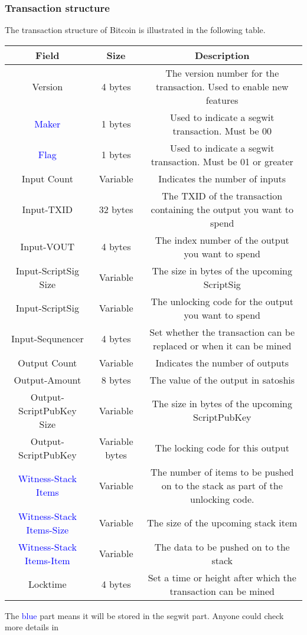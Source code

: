 \subsubsection{Transaction structure}

The transaction structure of Bitcoin is illustrated in the following table. \newline

\begin{tabular}{|c|c|c|} \hline
    Field & Size & Description \\ \hline
    Version & 4 bytes & The version number for the transaction. Used to enable new features  \\ \hline
    \textcolor{blue}{Maker} & 1 bytes & Used to indicate a segwit transaction. Must be 00 \\ \hline
    \textcolor{blue}{Flag} & 1 bytes & Used to indicate a segwit transaction. Must be 01 or greater  \\ \hline
    Input Count & Variable & Indicates the number of inputs  \\ \hline
    Input-TXID & 32 bytes & The TXID of the transaction containing the output you want to spend  \\ \hline
    Input-VOUT & 4 bytes & The index number of the output you want to spend  \\ \hline
    Input-ScriptSig Size & Variable & The size in bytes of the upcoming ScriptSig  \\ \hline
    Input-ScriptSig & Variable & The unlocking code for the output you want to spend  \\ \hline
    Input-Sequnencer & 4 bytes & Set whether the transaction can be replaced or when it can be mined  \\ \hline
    Output Count & Variable & Indicates the number of outputs  \\ \hline
    Output-Amount & 8 bytes & The value of the output in satoshis  \\ \hline
    Output-ScriptPubKey Size & Variable & The size in bytes of the upcoming ScriptPubKey  \\ \hline
    Output-ScriptPubKey & Variable bytes & The locking code for this output  \\ \hline
    \textcolor{blue}{Witness-Stack Items} & Variable & The number of items to be pushed on to the stack as part of the unlocking code.  \\ \hline
    \textcolor{blue}{Witness-Stack Items-Size} & Variable & The size of the upcoming stack item  \\ \hline
    \textcolor{blue}{Witness-Stack Items-Item} & Variable & The data to be pushed on to the stack  \\ \hline
    Locktime & 4 bytes & Set a time or height after which the transaction can be mined  \\ \hline
\end{tabular}

The \textcolor{blue}{blue} part means it will be stored in the segwit part. Anyone could check more details in \cite{website:transaction-structure}
